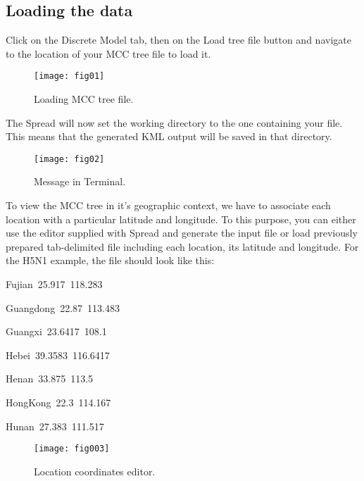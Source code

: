 \subsection{Loading the data}

Click on the Discrete Model tab, then on the Load tree file button
and navigate to the location of your MCC tree file to load it.

\begin{figure}[H]
\begin{centering}
\texttt{[image: fig01]}
\par\end{centering}
\caption{Loading MCC tree file.}
\label{fig:01}
\end{figure}


The Spread will now set the working directory to the one containing
your file. This means that the generated KML output will be saved
in that directory.

\begin{figure}[H]
\begin{centering}
\texttt{[image: fig02]}
\caption{Message in Terminal.}
\label{fig:02}
\par\end{centering}
\end{figure}


To view the MCC tree in it's geographic context, we have to associate
each location with a particular latitude and longitude. To this purpose,
you can either use the editor supplied with Spread and generate the
input file or load previously prepared tab-delimited file including
each location, its latitude and longitude. For the H5N1 example, the
file should look like this:

\begin{lyxcode}
Fujian~25.917~118.283

Guangdong~22.87~113.483

Guangxi~23.6417~108.1

Hebei~39.3583~116.6417

Henan~33.875~113.5

HongKong~22.3~114.167

Hunan~27.383~111.517
\end{lyxcode}

\begin{figure}[H]
\begin{centering}
\texttt{[image: fig003]}
\caption{Location coordinates editor.}
\label{fig:003}
\par\end{centering}
\end{figure}

